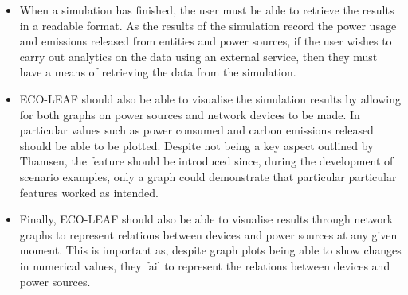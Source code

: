 \documentclass{l4proj}
\begin{document}
\begin{itemize}
    \item When a simulation has finished, the user must be able to retrieve the results in a readable format. As the results of the simulation record the power usage and emissions released from entities and power sources, if the user wishes to carry out analytics on the data using an external service, then they must have a means of retrieving the data from the simulation.
    \item ECO-LEAF should also be able to visualise the simulation results by allowing for both graphs on power sources and network devices to be made. In particular values such as power consumed and carbon emissions released should be able to be plotted. Despite not being a key aspect outlined by Thamsen, the feature should be introduced since, during the development of scenario examples, only a graph could demonstrate that particular particular features worked as intended.
    \item Finally, ECO-LEAF should also be able to visualise results through network graphs to represent relations between devices and power sources at any given moment. This is important as, despite graph plots being able to show changes in numerical values, they fail to represent the relations between devices and power sources.
\end{itemize}
\end{document}
